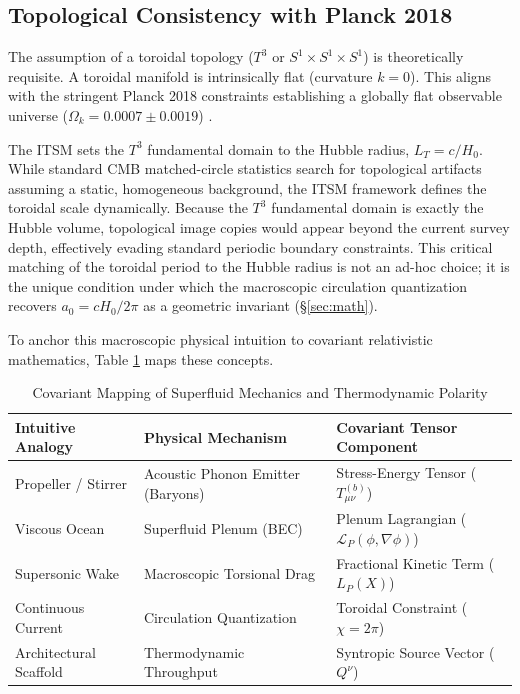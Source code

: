 \documentclass[aps,prd,10pt,onecolumn,superscriptaddress,nofootinbib]{revtex4-2}
\begin{document}
\subsection{Topological Consistency with Planck 2018}
The assumption of a toroidal topology ($T^3$ or $S^1 \times S^1 \times S^1$) is theoretically requisite. A toroidal manifold is intrinsically flat (curvature $k=0$). This aligns with the stringent Planck 2018 constraints establishing a globally flat observable universe ($\Omega_k = 0.0007 \pm 0.0019$) \cite{planck}.

The ITSM sets the $T^3$ fundamental domain to the Hubble radius, $L_T = c/H_0$. While standard CMB matched-circle statistics \cite{planck_topology} search for topological artifacts assuming a static, homogeneous background, the ITSM framework defines the toroidal scale dynamically. Because the $T^3$ fundamental domain is exactly the Hubble volume, topological image copies would appear beyond the current survey depth, effectively evading standard periodic boundary constraints. This critical matching of the toroidal period to the Hubble radius is not an ad-hoc choice; it is the unique condition under which the macroscopic circulation quantization recovers $a_0 = cH_0/2\pi$ as a geometric invariant (\S\ref{sec:math}).

To anchor this macroscopic physical intuition to covariant relativistic mathematics, Table \ref{tab:covariant} maps these concepts.

\begin{table}[htbp]
\centering
\caption{\footnotesize Covariant Mapping of Superfluid Mechanics and Thermodynamic Polarity}
\label{tab:covariant}
\begin{tabular}{lll}
\toprule
\textbf{Intuitive Analogy} & \textbf{Physical Mechanism} & \textbf{Covariant Tensor Component} \\
\midrule
Propeller / Stirrer & Acoustic Phonon Emitter (Baryons) & Stress-Energy Tensor ($T_{\mu\nu}^{(b)}$) \\
Viscous Ocean & Superfluid Plenum (BEC) & Plenum Lagrangian ($\mathcal{L}_P(\phi,\nabla\phi)$) \\
Supersonic Wake & Macroscopic Torsional Drag & Fractional Kinetic Term ($L_P(X)$) \\
Continuous Current & Circulation Quantization & Toroidal Constraint ($\chi=2\pi$) \\
Architectural Scaffold & Thermodynamic Throughput & Syntropic Source Vector ($Q^\nu$) \\
\bottomrule
\end{tabular}
\end{table}
\end{document}
